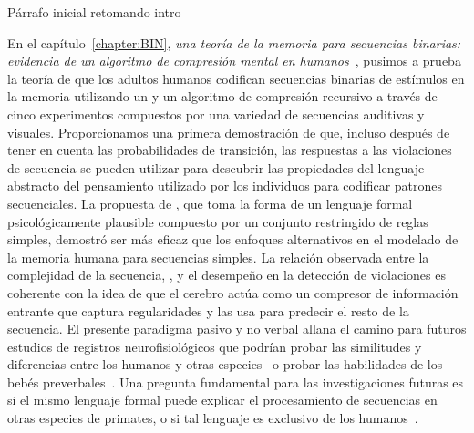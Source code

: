 

Párrafo inicial retomando intro

En el capítulo~\ref{chapter:BIN}, \textit{una teoría de la memoria para secuencias binarias: evidencia de un algoritmo de compresión mental en humanos~\cite{planton2021memory}}, pusimos a prueba la teoría de que los adultos humanos codifican secuencias binarias de estímulos en la memoria utilizando un \lot y un algoritmo de compresión recursivo a través de cinco experimentos compuestos por una variedad de secuencias auditivas y visuales. Proporcionamos una primera demostración de que, incluso después de tener en cuenta las probabilidades de transición, las respuestas a las violaciones de secuencia se pueden utilizar para descubrir las propiedades del lenguaje abstracto del pensamiento utilizado por los individuos para codificar patrones secuenciales. La propuesta de \grambin, que toma la forma de un lenguaje formal psicológicamente plausible compuesto por un conjunto restringido de reglas simples, demostró ser más eficaz que los enfoques alternativos en el modelado de la memoria humana para secuencias simples. La relación observada entre la complejidad de la secuencia, \mdlbin, y el desempeño en la detección de violaciones es coherente con la idea de que el cerebro actúa como un compresor de información entrante que captura regularidades y las usa para predecir el resto de la secuencia. El presente paradigma pasivo y no verbal allana el camino para futuros estudios de registros neurofisiológicos que podrían probar las similitudes y diferencias entre los humanos y otras especies~\cite{f13} o probar las habilidades de los bebés preverbales~\cite{f70}. Una pregunta fundamental para las investigaciones futuras es si el mismo lenguaje formal puede explicar el procesamiento de secuencias en otras especies de primates, o si tal lenguaje es exclusivo de los humanos~\cite{f6}.

